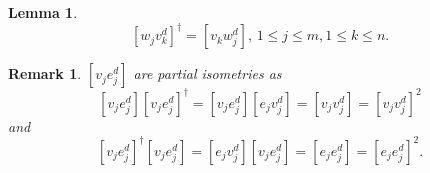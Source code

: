 \documentclass[aps,preprint]{revtex4}%
\newtheorem{lemma}[theorem]{Lemma}
\newtheorem{remark}[theorem]{Remark}
\begin{document}
\begin{lemma}%
\begin{equation}
\left[  w_{j}v_{k}^{d}\right]  ^{\dagger}=\left[  v_{k}w_{j}^{d}\right]
,\,1\leq j\leq m,1\leq k\leq n.
\end{equation}

\end{lemma}

\begin{remark}
$\left[  v_{j}e_{j}^{d}\right]  $ are partial isometries as
\begin{equation}
\left[  v_{j}e_{j}^{d}\right]  \left[  v_{j}e_{j}^{d}\right]  ^{\dagger
}=\left[  v_{j}e_{j}^{d}\right]  \left[  e_{j}v_{j}^{d}\right]  =\left[
v_{j}v_{j}^{d}\right]  =\left[  v_{j}v_{j}^{d}\right]  ^{2}%
\end{equation}
and
\begin{equation}
\left[  v_{j}e_{j}^{d}\right]  ^{\dagger}\left[  v_{j}e_{j}^{d}\right]
=\left[  e_{j}v_{j}^{d}\right]  \left[  v_{j}e_{j}^{d}\right]  =\left[
e_{j}e_{j}^{d}\right]  =\left[  e_{j}e_{j}^{d}\right]  ^{2}.
\end{equation}

\end{remark}
\end{document}
